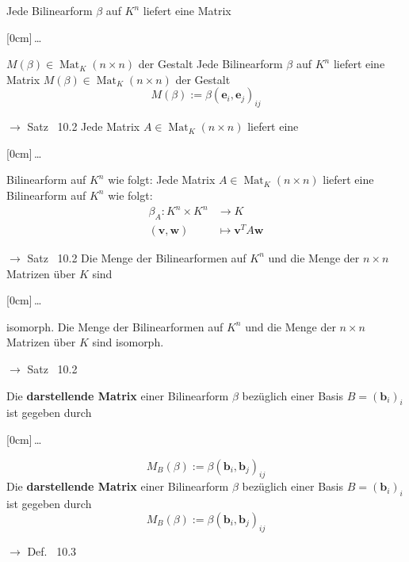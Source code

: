 \documentclass[11pt]{article}
\renewcommand{\cite}[1]{\par\bigskip\hfill{\color{gray}\tiny\(\to\) #1}}
\renewcommand{\vec}[1]{\mathbf{#1}}
\DeclareMathOperator{\Mat}{Mat}
\newcommand{\hide}[1]{\parbox{0cm}{\raisebox{-7pt}[0cm]{\dots}}\color{white}#1\color{black}}
\let\olddots\dots
\renewcommand{\dots}{\,\olddots\,}
\newenvironment{field}{}{\newpage}
\newif\ifnote
\newenvironment{note}{\notetrue}{\notefalse}
\newcommand{\localtag}{}
\newcommand{\globaltag}{}
\newcommand{\uuid}{}
\newcommand{\tags}[1]{
    \ifnote
        \renewcommand{\localtag}{#1}
    \else
        \renewcommand{\globaltag}{#1}
    \fi
    }
\newcommand{\xplain}[1]{\renewcommand{\uuid}{#1}}
\begin{document}
\begin{note}
    \tags{Satz}
    \xplain{d607e83e-b98f-11ec-8422-0242ac120002}
    \begin{field}
    Jede Bilinearform \(\beta\) auf \(K^n\) liefert eine Matrix \hide{\(M(\beta)\in \Mat_K(n\times n)\) der Gestalt}
    \end{field}
    \begin{field}
    Jede Bilinearform \(\beta\) auf \(K^n\) liefert eine Matrix \(M(\beta)\in \Mat_K(n\times n)\) der Gestalt
    \[M(\beta) := \beta(\vec{e}_i, \vec{e}_j)_{ij}\] \cite{Satz ~10.2}
    \end{field}
    \begin{field}
    Jede Matrix \(A\in\Mat_K(n\times n)\) liefert eine \hide{Bilinearform auf \(K^n\)} wie folgt:
    \end{field}
    \begin{field}
    Jede Matrix \(A\in\Mat_K(n\times n)\) liefert eine Bilinearform auf \(K^n\) wie folgt:
    \begin{align*}
    \beta_A: K^n\times K^n &\longrightarrow K \\
    (\vec{v}, \vec{w}) &\mapsto \vec{v}^T A \vec{w}
    \end{align*}
    \cite{Satz ~10.2}
    \end{field}
    \begin{field}
    Die Menge der Bilinearformen auf \(K^n\) und die Menge der \(n\times n\) Matrizen über \(K\) sind \hide{isomorph}.
    \end{field}
    \begin{field}
    Die Menge der Bilinearformen auf \(K^n\) und die Menge der \(n\times n\) Matrizen über \(K\) sind isomorph.
    \cite{Satz ~10.2}
    \end{field}
\end{note}

\begin{note}
    \tags{Def}
    \xplain{51387522-ba4a-11ec-8422-0242ac120002}
    \begin{field}
    Die \textbf{darstellende Matrix} einer Bilinearform \(\beta\) bezüglich einer Basis \(B=(\vec{b}_i)_i\) ist gegeben durch \hide{\[M_B(\beta) := \beta(\vec{b}_i, \vec{b}_j)_{ij}\]}
    \end{field}
    \begin{field}
    Die \textbf{darstellende Matrix} einer Bilinearform \(\beta\) bezüglich einer Basis \(B=(\vec{b}_i)_i\) ist gegeben durch
    \[M_B(\beta) := \beta(\vec{b}_i, \vec{b}_j)_{ij}\]
    \cite{Def. ~10.3}
    \end{field}
\end{note}
\end{document}
